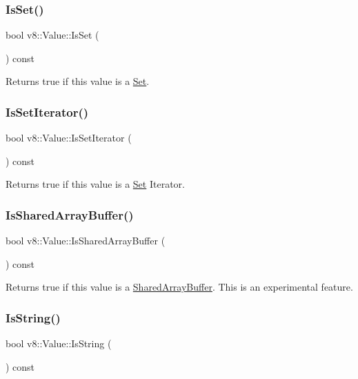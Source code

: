 \subsubsection{\texorpdfstring{Is\+Set()}{IsSet()}}
{\footnotesize\ttfamily bool v8\+::\+Value\+::\+Is\+Set (\begin{DoxyParamCaption}{ }\end{DoxyParamCaption}) const}

Returns true if this value is a \mbox{\hyperlink{classv8_1_1Set}{Set}}. \mbox{\label{classv8_1_1Value_a908403b5e09eb5dc0087b562b01618a4}} 
\subsubsection{\texorpdfstring{Is\+Set\+Iterator()}{IsSetIterator()}}
{\footnotesize\ttfamily bool v8\+::\+Value\+::\+Is\+Set\+Iterator (\begin{DoxyParamCaption}{ }\end{DoxyParamCaption}) const}

Returns true if this value is a \mbox{\hyperlink{classv8_1_1Set}{Set}} Iterator. \mbox{\label{classv8_1_1Value_a1d7d90fe704feab89dcbdc383ab298b2}} 
\subsubsection{\texorpdfstring{Is\+Shared\+Array\+Buffer()}{IsSharedArrayBuffer()}}
{\footnotesize\ttfamily bool v8\+::\+Value\+::\+Is\+Shared\+Array\+Buffer (\begin{DoxyParamCaption}{ }\end{DoxyParamCaption}) const}

Returns true if this value is a \mbox{\hyperlink{classv8_1_1SharedArrayBuffer}{Shared\+Array\+Buffer}}. This is an experimental feature. \mbox{\label{classv8_1_1Value_a6c7582919eec6f30e865b3300eff9a8e}} 
\subsubsection{\texorpdfstring{Is\+String()}{IsString()}}
{\footnotesize\ttfamily bool v8\+::\+Value\+::\+Is\+String (\begin{DoxyParamCaption}{ }\end{DoxyParamCaption}) const}

